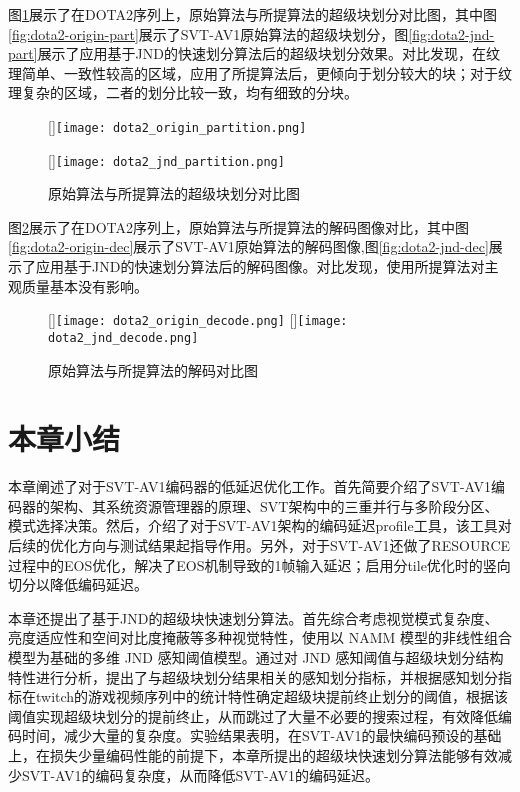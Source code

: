   图\ref{fig:dota2-part}展示了在DOTA2序列上，原始算法与所提算法的超级块划分对比图，其中图\ref{fig:dota2-origin-part}展示了SVT-AV1原始算法的超级块划分，图\ref{fig:dota2-jnd-part}展示了应用基于JND的快速划分算法后的超级块划分效果。对比发现，在纹理简单、一致性较高的区域，应用了所提算法后，更倾向于划分较大的块；对于纹理复杂的区域，二者的划分比较一致，均有细致的分块。

  \begin{figure}[!hbtp]
    \centering
                    [\textwidth]{\texttt{[image: dota2\_origin\_partition.png]}}
    \vspace{0.5cm}

                    [\textwidth]{\texttt{[image: dota2\_jnd\_partition.png]}}
    \caption{原始算法与所提算法的超级块划分对比图}
    \label{fig:dota2-part}
  \end{figure}

  图\ref{fig:dota2-decode}展示了在DOTA2序列上，原始算法与所提算法的解码图像对比，其中图\ref{fig:dota2-origin-dec}展示了SVT-AV1原始算法的解码图像,图\ref{fig:dota2-jnd-dec}展示了应用基于JND的快速划分算法后的解码图像。对比发现，使用所提算法对主观质量基本没有影响。

  \begin{figure}[!hbtp]
    \centering
                    [\textwidth]{\texttt{[image: dota2\_origin\_decode.png]}}
    \vspace{0.5cm}
                    [\textwidth]{\texttt{[image: dota2\_jnd\_decode.png]}}
    \caption{原始算法与所提算法的解码对比图}
    \label{fig:dota2-decode}
  \end{figure}

  \section{本章小结}
  本章阐述了对于SVT-AV1编码器的低延迟优化工作。首先简要介绍了SVT-AV1编码器的架构、其系统资源管理器的原理、SVT架构中的三重并行与多阶段分区、模式选择决策。然后，介绍了对于SVT-AV1架构的编码延迟profile工具，该工具对后续的优化方向与测试结果起指导作用。另外，对于SVT-AV1还做了RESOURCE过程中的EOS优化，解决了EOS机制导致的1帧输入延迟；启用分tile优化时的竖向切分以降低编码延迟。

  本章还提出了基于JND的超级块快速划分算法。首先综合考虑视觉模式复杂度、亮度适应性和空间对比度掩蔽等多种视觉特性，使用以 NAMM 模型的非线性组合模型为基础的多维 JND 感知阈值模型。通过对 JND 感知阈值与超级块划分结构特性进行分析，提出了与超级块划分结果相关的感知划分指标，并根据感知划分指标在twitch的游戏视频序列中的统计特性确定超级块提前终止划分的阈值，根据该阈值实现超级块划分的提前终止，从而跳过了大量不必要的搜索过程，有效降低编码时间，减少大量的复杂度。实验结果表明，在SVT-AV1的最快编码预设的基础上，在损失少量编码性能的前提下，本章所提出的超级块快速划分算法能够有效减少SVT-AV1的编码复杂度，从而降低SVT-AV1的编码延迟。
